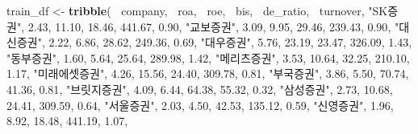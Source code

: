 \documentclass[]{book}
\newenvironment{Shaded}{\begin{snugshade}}{\end{snugshade}}
\newcommand{\FloatTok}[1]{\textcolor[rgb]{0.00,0.00,0.81}{#1}}
\newcommand{\KeywordTok}[1]{\textcolor[rgb]{0.13,0.29,0.53}{\textbf{#1}}}
\newcommand{\NormalTok}[1]{#1}
\newcommand{\OperatorTok}[1]{\textcolor[rgb]{0.81,0.36,0.00}{\textbf{#1}}}
\newcommand{\StringTok}[1]{\textcolor[rgb]{0.31,0.60,0.02}{#1}}
\begin{document}
\begin{Shaded}
\begin{Highlighting}[]
\NormalTok{train_df <-}\StringTok{ }\KeywordTok{tribble}\NormalTok{(}
  \OperatorTok{~}\NormalTok{company, }\OperatorTok{~}\NormalTok{roa, }\OperatorTok{~}\NormalTok{roe, }\OperatorTok{~}\NormalTok{bis, }\OperatorTok{~}\NormalTok{de_ratio, }\OperatorTok{~}\NormalTok{turnover,}
  \StringTok{"SK증권"}\NormalTok{, }\FloatTok{2.43}\NormalTok{, }\FloatTok{11.10}\NormalTok{, }\FloatTok{18.46}\NormalTok{, }\FloatTok{441.67}\NormalTok{, }\FloatTok{0.90}\NormalTok{,}
  \StringTok{"교보증권"}\NormalTok{, }\FloatTok{3.09}\NormalTok{, }\FloatTok{9.95}\NormalTok{, }\FloatTok{29.46}\NormalTok{, }\FloatTok{239.43}\NormalTok{, }\FloatTok{0.90}\NormalTok{,}
  \StringTok{"대신증권"}\NormalTok{, }\FloatTok{2.22}\NormalTok{, }\FloatTok{6.86}\NormalTok{, }\FloatTok{28.62}\NormalTok{, }\FloatTok{249.36}\NormalTok{, }\FloatTok{0.69}\NormalTok{,}
  \StringTok{"대우증권"}\NormalTok{, }\FloatTok{5.76}\NormalTok{, }\FloatTok{23.19}\NormalTok{, }\FloatTok{23.47}\NormalTok{, }\FloatTok{326.09}\NormalTok{, }\FloatTok{1.43}\NormalTok{,}
  \StringTok{"동부증권"}\NormalTok{, }\FloatTok{1.60}\NormalTok{, }\FloatTok{5.64}\NormalTok{, }\FloatTok{25.64}\NormalTok{, }\FloatTok{289.98}\NormalTok{, }\FloatTok{1.42}\NormalTok{,}
  \StringTok{"메리츠증권"}\NormalTok{, }\FloatTok{3.53}\NormalTok{, }\FloatTok{10.64}\NormalTok{, }\FloatTok{32.25}\NormalTok{, }\FloatTok{210.10}\NormalTok{, }\FloatTok{1.17}\NormalTok{,}
  \StringTok{"미래에셋증권"}\NormalTok{, }\FloatTok{4.26}\NormalTok{, }\FloatTok{15.56}\NormalTok{, }\FloatTok{24.40}\NormalTok{, }\FloatTok{309.78}\NormalTok{, }\FloatTok{0.81}\NormalTok{,}
  \StringTok{"부국증권"}\NormalTok{, }\FloatTok{3.86}\NormalTok{, }\FloatTok{5.50}\NormalTok{, }\FloatTok{70.74}\NormalTok{, }\FloatTok{41.36}\NormalTok{, }\FloatTok{0.81}\NormalTok{,}
  \StringTok{"브릿지증권"}\NormalTok{, }\FloatTok{4.09}\NormalTok{, }\FloatTok{6.44}\NormalTok{, }\FloatTok{64.38}\NormalTok{, }\FloatTok{55.32}\NormalTok{, }\FloatTok{0.32}\NormalTok{,}
  \StringTok{"삼성증권"}\NormalTok{, }\FloatTok{2.73}\NormalTok{, }\FloatTok{10.68}\NormalTok{, }\FloatTok{24.41}\NormalTok{, }\FloatTok{309.59}\NormalTok{, }\FloatTok{0.64}\NormalTok{,}
  \StringTok{"서울증권"}\NormalTok{, }\FloatTok{2.03}\NormalTok{, }\FloatTok{4.50}\NormalTok{, }\FloatTok{42.53}\NormalTok{, }\FloatTok{135.12}\NormalTok{, }\FloatTok{0.59}\NormalTok{,}
  \StringTok{"신영증권"}\NormalTok{, }\FloatTok{1.96}\NormalTok{, }\FloatTok{8.92}\NormalTok{, }\FloatTok{18.48}\NormalTok{, }\FloatTok{441.19}\NormalTok{, }\FloatTok{1.07}\NormalTok{,}

\end{Highlighting}
\end{Shaded}
\end{document}
